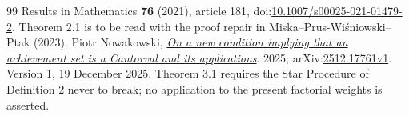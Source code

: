 \begin{thebibliography}{99}
  Results in Mathematics \textbf{76} (2021), article 181, doi:\href{https://doi.org/10.1007/s00025-021-01479-2}{10.1007/s00025-021-01479-2}. Theorem 2.1 is to be read with the proof repair in Miska--Prus-Wi\'sniowski--Ptak (2023).
 Piotr Nowakowski, \href{https://arxiv.org/abs/2512.17761v1}{\emph{On a new condition implying that an achievement set is a Cantorval and its applications}}.
  2025; arXiv:\href{https://arxiv.org/abs/2512.17761v1}{2512.17761v1}. Version 1, 19 December 2025. Theorem 3.1 requires the Star Procedure of Definition 2 never to break; no application to the present factorial weights is asserted.
\end{thebibliography}

